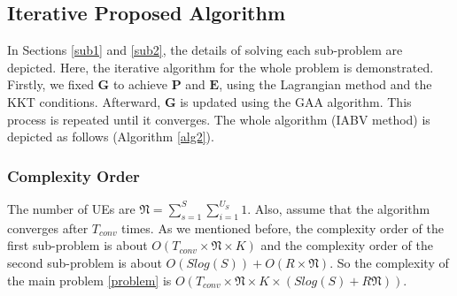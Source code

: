 \documentclass[lettersize,journal]{IEEEtran}
\begin{document}
\subsection{Iterative Proposed Algorithm}
In Sections \eqref{sub1} and \eqref{sub2}, the details of solving each sub-problem are depicted. 
Here, the iterative algorithm for the whole problem is demonstrated.
Firstly, we fixed $\boldsymbol{G}$ to achieve $\boldsymbol{P}$ and $\boldsymbol{E}$, using the Lagrangian method and the KKT conditions.  
Afterward, $\boldsymbol{G}$ is updated using the GAA algorithm. This process is repeated until it converges. 
The whole algorithm (IABV method) is depicted as follows (Algorithm \ref{alg2}).

\subsubsection{Complexity Order}
The number of UEs are $\mathfrak{N} = \sum_{s=1}^{S}\sum_{i=1}^{U_S}1$.
Also, assume that the algorithm converges after $T_{conv}$ times.
As we mentioned before, the complexity order of the first sub-problem is about $O(T_{conv} \times \mathfrak{N} \times K)$
and the complexity order of the second sub-problem is about $O(Slog(S)) + O(R\times \mathfrak{N})$.
So the complexity of the main problem \eqref{problem} is $O(T_{conv} \times \mathfrak{N} \times K \times (Slog(S)+R\mathfrak{N}))$.
\end{document}
